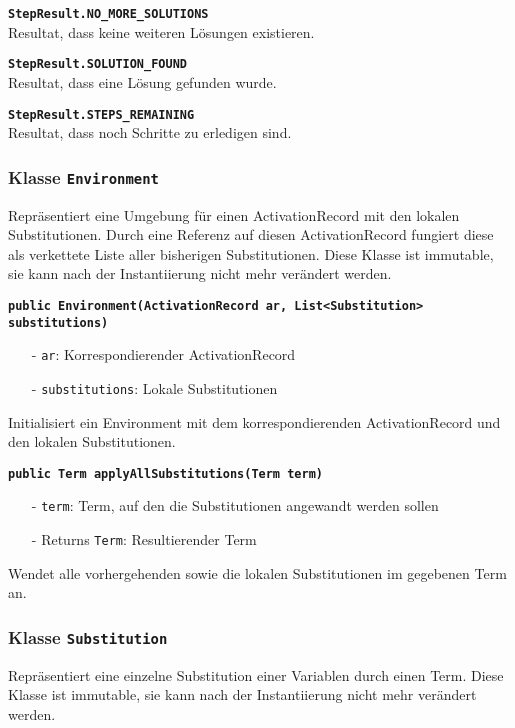\documentclass[parskip=full,11pt,twoside]{scrartcl}
\begin{document}
\textbf{\texttt{StepResult.NO\_MORE\_SOLUTIONS}}\\
Resultat, dass keine weiteren Lösungen existieren.

\textbf{\texttt{StepResult.SOLUTION\_FOUND}}\\
Resultat, dass eine Lösung gefunden wurde.

\textbf{\texttt{StepResult.STEPS\_REMAINING}}\\
Resultat, dass noch Schritte zu erledigen sind.

\subsubsection{Klasse \texttt{Environment}}
Repräsentiert eine Umgebung für einen ActivationRecord mit den lokalen Substitutionen. Durch eine Referenz auf diesen ActivationRecord fungiert diese als verkettete Liste aller bisherigen Substitutionen. Diese Klasse ist immutable, sie kann nach der Instantiierung nicht mehr verändert werden.

\textbf{\texttt{public Environment(ActivationRecord ar, List<Substitution>\\ substitutions)}}
\begin{itemize}[noitemsep]
	\item[-] \texttt{ar}: Korrespondierender ActivationRecord
	\item[-] \texttt{substitutions}: Lokale Substitutionen
\end{itemize}
Initialisiert ein Environment mit dem korrespondierenden ActivationRecord und den lokalen Substitutionen.

\textbf{\texttt{public Term applyAllSubstitutions(Term term)}}
\begin{itemize}[noitemsep]
	\item[-] \texttt{term}: Term, auf den die Substitutionen angewandt werden sollen
	\item[-] Returns \texttt{Term}: Resultierender Term
\end{itemize}
Wendet alle vorhergehenden sowie die lokalen Substitutionen im gegebenen Term an.

\subsubsection{Klasse \texttt{Substitution}}
Repräsentiert eine einzelne Substitution einer Variablen durch einen Term. Diese Klasse ist immutable, sie kann nach der Instantiierung nicht mehr verändert werden.
\end{document}

